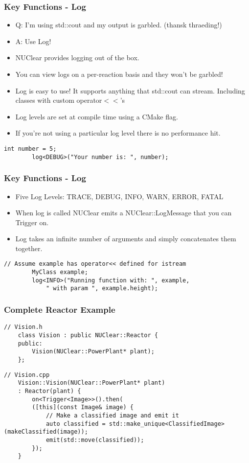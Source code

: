 \documentclass{beamer}
\begin{document}
\begin{frame}[fragile]
	\frametitle{Key Functions - Log}
	\begin{itemize}
		\item Q: I'm using std::cout and my output is garbled. (thansk thraeding!)
		\item A: Use Log!
		\item NUClear provides logging out of the box.
		\item You can view logs on a per-reaction basis and they won't be garbled!
		\item Log is easy to use! It supports anything that std::cout can stream.
			Including classes with custom operator$<<$'s
		\item Log levels are set at compile time using a CMake flag.
		\item If you're not using a particular log level there is no performance hit.
	\end{itemize}

	\begin{lstlisting}[language=nuclear]
		int number = 5;
		log<DEBUG>("Your number is: ", number);
	\end{lstlisting}
\end{frame}

\begin{frame}[fragile]
	\frametitle{Key Functions - Log}
	\begin{itemize}
		\item Five Log Levels: TRACE, DEBUG, INFO, WARN, ERROR, FATAL
		\item When log is called NUClear emits a NUClear::LogMessage that you can Trigger on.
		\item Log takes an infinite number of arguments and simply concatenates them together.
	\end{itemize}

	\begin{lstlisting}[language=nuclear]
		// Assume example has operator<< defined for istream
		MyClass example;
		log<INFO>("Running function with: ", example,
		    " with param ", example.height);
	\end{lstlisting}
\end{frame}

\begin{frame}[fragile]
	\frametitle{Complete Reactor Example}

	\begin{lstlisting}[language=nuclear]
	// Vision.h
	class Vision : public NUClear::Reactor {
	public:
	    Vision(NUClear::PowerPlant* plant);
	};
	\end{lstlisting}

	\begin{lstlisting}[language=nuclear]
	// Vision.cpp
	Vision::Vision(NUClear::PowerPlant* plant)
	: Reactor(plant) {
	    on<Trigger<Image>>().then(
	    ([this](const Image& image) {
	        // Make a classified image and emit it
	        auto classified = std::make_unique<ClassifiedImage>(makeClassified(image));
	        emit(std::move(classified));
	    });
	}
	\end{lstlisting}
\end{frame}
\end{document}
